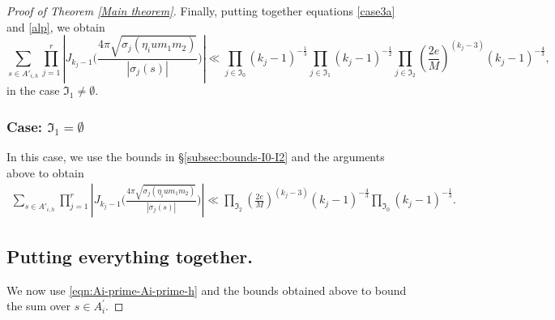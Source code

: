 \documentclass[reqno]{amsart}
\theoremstyle{plain}
\theoremstyle{definition}
\theoremstyle{remark}
\begin{document}
\begin{proof}[Proof of Theorem \ref{Main theorem}]
 
Finally, putting together equations \eqref{case3a} and \eqref{alp}, we obtain 
\begin{equation}\label{a_jeq1}
 \sum_{s\in A'_{i,h} }    \prod_{j=1}^r \left| J_{k_j-1} \Big(  \frac{4 \pi\sqrt{\sigma_j (\eta_i u m_1m_2 )}}{|\sigma_j(s)|}\Big)\right| \ll   \prod_{j \in \mathfrak{I}_0} (k_j - 1)^{-\frac{1}{3}}  \prod_{j \in \mathfrak{I}_1} (k_j - 1)^{-\frac{1}{2}} \prod_{j \in \mathfrak{I}_2} \left(\frac{2 e}{M}\right)^{(k_j - 3)}    (k_j - 1)^{-\frac{4}{3}},    
\end{equation}
in the case $\mathfrak{I}_1 \neq \emptyset$.

\subsubsection{Case: $\mathfrak{I}_1 = \emptyset$}\label{step b}
In this case,  we use the bounds in \S \ref{subsec:bounds-I0-I2} and the arguments above to obtain
 \begin{align}\label{a_jneq1}
\sum_{s\in A'_{i,h} }    \prod_{j=1}^r \left| J_{k_j-1} \Big(  \frac{4 \pi\sqrt{\sigma_j (\eta_i u m_1m_2 )}}{|\sigma_j(s)|}\Big)\right|
\ll    \prod_{\mathfrak{I}_2} \left(\frac{2 e}{M}\right)^{(k_j-3)}  (k_j-1)^{-\frac{4}{3}} \prod_{\mathfrak{I}_0} (k_j-1)^{-\frac{1}{3}}.
\end{align}


\subsection{Putting everything together.}\label{last step}

We now use \eqref{eqn:Ai-prime-Ai-prime-h} and the bounds obtained above to bound the sum over $s \in A^\prime_i$. 


\end{proof}
\end{document}
